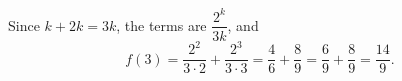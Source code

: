 Since $k+2k=3k$, the terms are $\dfrac{2^k}{3k}$, and
\[
f(3)=\dfrac{2^2}{3\cdot2}+\dfrac{2^3}{3\cdot3}=\dfrac{4}{6}+\dfrac{8}{9}=\dfrac{6}{9}+\dfrac{8}{9}=\boxed{\dfrac{14}{9}}.
\]
